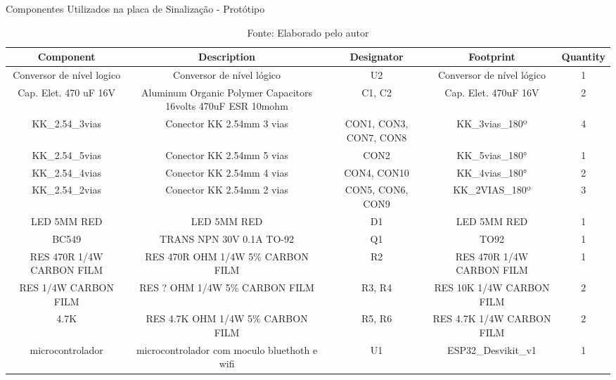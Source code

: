 \documentclass[../delivery_hospital_report.tex]{subfiles}
\begin{document}
\begin{table}[]
\caption{Componentes Utilizados na placa de Sinalização - Protótipo}
\centering
\begin{adjustbox}{width=\columnwidth,center}
\begin{tabular}{|c|c|c|c|c|}
\hline
Component                   & Description                                                    & Designator               & Footprint                   & Quantity \\ \hline
Conversor de   nível logico & Conversor de nível   lógico                                    & U2                       & Conversor de nível   lógico & 1        \\ \hline
Cap. Elet. 470   uF 16V     & Aluminum Organic   Polymer Capacitors 16volts 470uF ESR 10mohm & C1, C2                   & Cap. Elet. 470uF 16V        & 2        \\ \hline
KK\_2.54\_3vias             & Conector KK 2.54mm 3   vias                                    & CON1, CON3, CON7,   CON8 & KK\_3vias\_180º             & 4        \\ \hline
KK\_2.54\_5vias             & Conector KK 2.54mm 5   vias                                    & CON2                     & KK\_5vias\_180°             & 1        \\ \hline
KK\_2.54\_4vias             & Conector KK 2.54mm 4   vias                                    & CON4, CON10              & KK\_4vias\_180°             & 2        \\ \hline
KK\_2.54\_2vias             & Conector KK 2.54mm 2   vias                                    & CON5, CON6, CON9         & KK\_2VIAS\_180º             & 3        \\ \hline
LED 5MM RED                 & LED 5MM RED                                                    & D1                       & LED 5MM RED                 & 1        \\ \hline
BC549                       & TRANS NPN 30V 0.1A   TO-92                                     & Q1                       & TO92                        & 1        \\ \hline
RES 470R 1/4W   CARBON FILM & RES 470R OHM 1/4W 5\%   CARBON FILM                            & R2                       & RES 470R 1/4W CARBON   FILM & 1        \\ \hline
RES 1/4W   CARBON FILM      & RES ? OHM 1/4W 5\%   CARBON FILM                               & R3, R4                   & RES 10K 1/4W CARBON   FILM  & 2        \\ \hline
4.7K                        & RES 4.7K OHM 1/4W 5\%   CARBON FILM                            & R5, R6                   & RES 4.7K 1/4W CARBON   FILM & 2        \\ \hline
microcontrolador            & microcontrolador com   moculo bluethoth e wifi                 & U1                       & ESP32\_Desvikit\_v1         & 1        \\ \hline

\end{tabular}
\end{adjustbox}
\centering
\caption*{Fonte: Elaborado pelo autor}
\label{table:voc}
\end{table}
\end{document}
